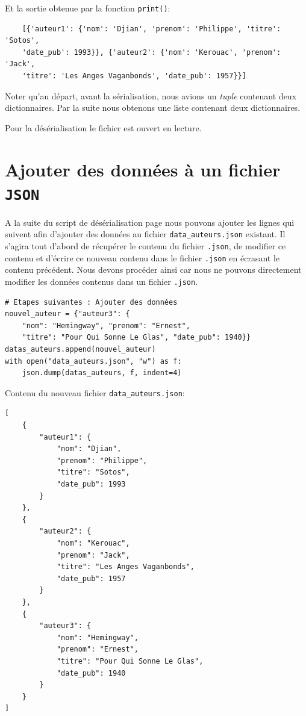 \documentclass[a4paper,11pt]{book}
\begin{document}
Et la sortie obtenue par la fonction \texttt{print()}:
\begin{verbatim}
    [{'auteur1': {'nom': 'Djian', 'prenom': 'Philippe', 'titre': 'Sotos', 
    'date_pub': 1993}}, {'auteur2': {'nom': 'Kerouac', 'prenom': 'Jack', 
    'titre': 'Les Anges Vaganbonds', 'date_pub': 1957}}]
\end{verbatim}
\medskip

Noter qu'au départ, avant la sérialisation, nous avions un \textit{tuple} contenant deux dictionnaires. Par la suite nous obtenons une liste contenant deux dictionnaires.
\medskip

Pour la désérialisation le fichier est ouvert en lecture.
\medskip

\section{Ajouter des données à un fichier \texttt{JSON}}
A la suite du script de désérialisation page \pageref{deserialisationJSON} nous pouvons ajouter les lignes qui suivent afin d'ajouter des données au fichier \texttt{data\_auteurs.json} existant. Il s'agira tout d'abord de récupérer  le contenu du fichier \texttt{.json}, de modifier ce contenu et d'écrire ce nouveau contenu dans le fichier \texttt{.json} en écrasant le contenu précédent. Nous devons procéder ainsi car nous ne pouvons directement modifier les données contenus dans un fichier \texttt{.json}.
\begin{lstlisting}[caption=Ajouter des données à un fichier \texttt{.json} existant.]
# Etapes suivantes : Ajouter des données
nouvel_auteur = {"auteur3": {
    "nom": "Hemingway", "prenom": "Ernest",
    "titre": "Pour Qui Sonne Le Glas", "date_pub": 1940}}
datas_auteurs.append(nouvel_auteur)
with open("data_auteurs.json", "w") as f:
    json.dump(datas_auteurs, f, indent=4)
\end{lstlisting}
\medskip

Contenu du nouveau fichier \texttt{data\_auteurs.json}:
\begin{lstlisting}[caption=Contenu du fichier \texttt{data\_auteurs.json} augmenté des nouvelles données.]
[
    {
        "auteur1": {
            "nom": "Djian",
            "prenom": "Philippe",
            "titre": "Sotos",
            "date_pub": 1993
        }
    },
    {
        "auteur2": {
            "nom": "Kerouac",
            "prenom": "Jack",
            "titre": "Les Anges Vaganbonds",
            "date_pub": 1957
        }
    },
    {
        "auteur3": {
            "nom": "Hemingway",
            "prenom": "Ernest",
            "titre": "Pour Qui Sonne Le Glas",
            "date_pub": 1940
        }
    }
]
\end{lstlisting}
\medskip
\end{document}
